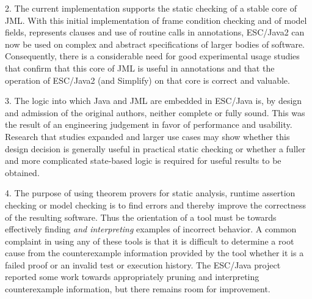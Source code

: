 \documentclass{acm_proc_article-sp}
\begin{document}
2. The current implementation supports the static checking of a
  stable core of JML.  With this initial implementation of frame
  condition checking and of model fields, represents clauses and use
  of routine calls in annotations, ESC/Java2 can now be used on
  complex and abstract specifications of larger bodies of software.
  Consequently, there is a considerable need for good experimental
  usage studies that confirm that this core of JML is useful in
  annotations and that the operation of ESC/Java2 (and Simplify) on
  that core is correct and valuable.

3. The logic into which Java and JML are embedded in ESC/Java is,
  by design and admission of the original authors, neither complete or
  fully sound.  This was the result of an engineering judgement in
  favor of performance and usability.  Research that studies expanded
  and larger use cases may show whether this design decision is
  generally useful in practical static checking or whether a fuller
  and more complicated state-based logic is required for useful
  results to be obtained.

4. The purpose of  using theorem provers for static analysis, runtime
 assertion checking or model checking is to find errors and thereby 
 improve the correctness of the resulting software.  Thus the orientation
 of a tool must be towards effectively finding {\em and interpreting} examples
 of incorrect behavior.   A common complaint in using any of these tools
 is that it is difficult to determine a root cause from the counterexample information
 provided by the tool whether it is a failed proof or an invalid test or execution history.
 The ESC/Java project reported some work towards appropriately pruning
 and interpreting counterexample information, but there remains room for
 improvement.
\end{document}
